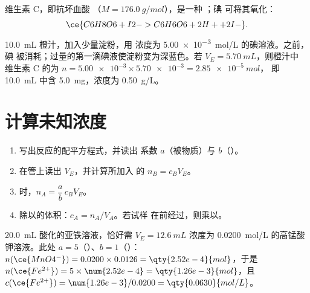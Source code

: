 \begin{example}[维生素 C 与碘]\label{ex:g11:titration:vitamin-c}
维生素 C，即抗坏血酸 （$M = \qty{176.0}{g/mol}$），是一种
；碘  可将其氧化：
\[
  \ce{C6H8O6 + I2 -> C6H6O6 + 2H+ + 2I-} .
\]
\qty{10.0}{mL} 橙汁，加入少量淀粉，用
浓度为 \qty{5.00e-3}{mol/L} 的碘溶液。之前，碘
被消耗；过量的第一滴碘液使淀粉变为深蓝色。若
$V_E = \qty{5.70}{mL}$，则橙汁中
维生素 C 的为 $n = \num{5.00e-3} \times \num{5.70e-3} = \qty{2.85e-5}{mol}$，
即 \qty{10.0}{mL} 中含 \qty{5.0}{mg}，浓度为 \qty{0.50}{g/L}。
\end{example}

\section{计算未知浓度}

\begin{method}[由滴定计算浓度]\label{met:g11:titration:computing}
\begin{enumerate}
  \item 写出反应的配平方程式，并读出
        系数 $a$（被物质）与 $b$（）。
  \item 在管上读出 $V_E$，并计算所加入
        的 $n_B = c_B V_E$。
  \item {}时，$n_A = \dfrac{a}{b}\, c_B V_E$。
  \item 除以的体积：$c_A = n_A / V_A$。若试样
        在前经过，则乘以。
\end{enumerate}
\end{method}

\begin{example}[一种亚铁离子溶液]\label{ex:g11:titration:iron}
\qty{20.0}{mL} 酸化的亚铁溶液，恰好需
$V_E = \qty{12.6}{mL}$ 浓度为 \qty{0.0200}{mol/L} 的高锰酸钾溶液。此处
$a = 5$（）、$b = 1$（）：
$n(\ce{MnO4^-}) = 0.0200 \times 0.0126 = \qty{2.52e-4}{mol}$，于是
$n(\ce{Fe^{2+}}) = 5 \times \num{2.52e-4} = \qty{1.26e-3}{mol}$，且
$c(\ce{Fe^{2+}}) = \num{1.26e-3} / 0.0200 = \qty{0.0630}{mol/L}$。
\end{example}

